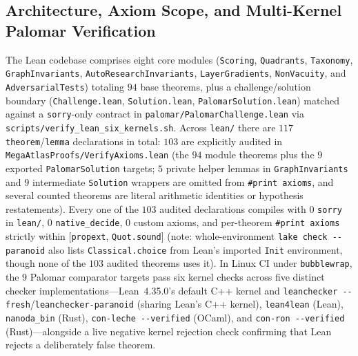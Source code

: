 \documentclass[11pt,reqno]{amsart}
\theoremstyle{plain}
\theoremstyle{definition}
\newcommand{\code}[1]{{\footnotesize\nolinkurl{#1}}}
\begin{document}
\subsection{Architecture, Axiom Scope, and Multi-Kernel Palomar Verification}
The Lean codebase comprises eight core modules (\code{Scoring}, \code{Quadrants}, \code{Taxonomy}, \code{GraphInvariants}, \code{AutoResearchInvariants}, \code{LayerGradients}, \code{NonVacuity}, and \code{AdversarialTests}) totaling $94$ base theorems, plus a challenge/solution boundary (\code{Challenge.lean}, \code{Solution.lean}, \code{PalomarSolution.lean}) matched against a \code{sorry}-only contract in \code{palomar/PalomarChallenge.lean} via \code{scripts/verify_lean_six_kernels.sh}. Across \code{lean/} there are $117$ \code{theorem}/\code{lemma} declarations in total: $103$ are explicitly audited in \code{MegaAtlasProofs/VerifyAxioms.lean} (the $94$ module theorems plus the $9$ exported \code{PalomarSolution} targets; $5$ private helper lemmas in \code{GraphInvariants} and $9$ intermediate \code{Solution} wrappers are omitted from {\footnotesize\texttt{\#print axioms}}, and several counted theorems are literal arithmetic identities or hypothesis restatements). Every one of the $103$ audited declarations compiles with $0$ \code{sorry} in \code{lean/}, $0$ \code{native_decide}, $0$ custom axioms, and per-theorem {\footnotesize\texttt{\#print axioms}} strictly within [\code{propext}, \code{Quot.sound}] (note: whole-environment \code{lake check --paranoid} also lists \code{Classical.choice} from Lean's imported \code{Init} environment, though none of the $103$ audited theorems uses it). In Linux CI under \code{bubblewrap}, the $9$ Palomar comparator targets pass six kernel checks across five distinct checker implementations---Lean~4.35.0's default C++ kernel and \code{leanchecker --fresh}/\code{leanchecker-paranoid} (sharing Lean's C++ kernel), \code{lean4lean} (Lean), \code{nanoda_bin} (Rust), \code{con-leche --verified} (OCaml), and \code{con-ron --verified} (Rust)---alongside a live negative kernel rejection check confirming that Lean rejects a deliberately false theorem.
\end{document}
